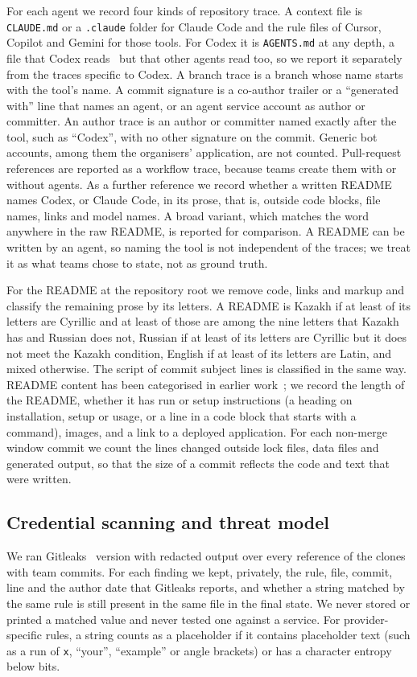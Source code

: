\documentclass{article}
\begin{document}
For each agent we record four kinds of repository trace. A context file is \texttt{CLAUDE.md} or a \texttt{.claude} folder for Claude Code and the rule files of Cursor, Copilot and Gemini for those tools. For Codex it is \texttt{AGENTS.md} at any depth, a file that Codex reads~\cite{openai2026agentsmd} but that other agents read too, so we report it separately from the traces specific to Codex. A branch trace is a branch whose name starts with the tool's name. A commit signature is a co-author trailer or a ``generated with'' line that names an agent, or an agent service account as author or committer. An author trace is an author or committer named exactly after the tool, such as ``Codex'', with no other signature on the commit. Generic bot accounts, among them the organisers' application, are not counted. Pull-request references are reported as a workflow trace, because teams create them with or without agents. As a further reference we record whether a written README names Codex, or Claude Code, in its prose, that is, outside code blocks, file names, links and model names. A broad variant, which matches the word anywhere in the raw README, is reported for comparison. A README can be written by an agent, so naming the tool is not independent of the traces; we treat it as what teams chose to state, not as ground truth.

For the README at the repository root we remove code, links and markup and classify the remaining prose by its letters. A README is Kazakh if at least \thrcyr{} of its letters are Cyrillic and at least \thrkaz{} of those are among the nine letters that Kazakh has and Russian does not, Russian if at least \thrcyr{} of its letters are Cyrillic but it does not meet the Kazakh condition, English if at least \thrlat{} of its letters are Latin, and mixed otherwise. The script of commit subject lines is classified in the same way. README content has been categorised in earlier work~\cite{prana2019readme}; we record the length of the README, whether it has run or setup instructions (a heading on installation, setup or usage, or a line in a code block that starts with a command), images, and a link to a deployed application. For each non-merge window commit we count the lines changed outside lock files, data files and generated output, so that the size of a commit reflects the code and text that were written.

\subsection{Credential scanning and threat model}
We ran Gitleaks~\cite{gitleaks2026} version \gitleaksversion{} with redacted output over every reference of the \NRqFourScannedRepos{} clones with team commits. For each finding we kept, privately, the rule, file, commit, line and the author date that Gitleaks reports, and whether a string matched by the same rule is still present in the same file in the final state. We never stored or printed a matched value and never tested one against a service. For provider-specific rules, a string counts as a placeholder if it contains placeholder text (such as a run of \texttt{x}, ``your'', ``example'' or angle brackets) or has a character entropy below \entropythr{} bits.
\end{document}
